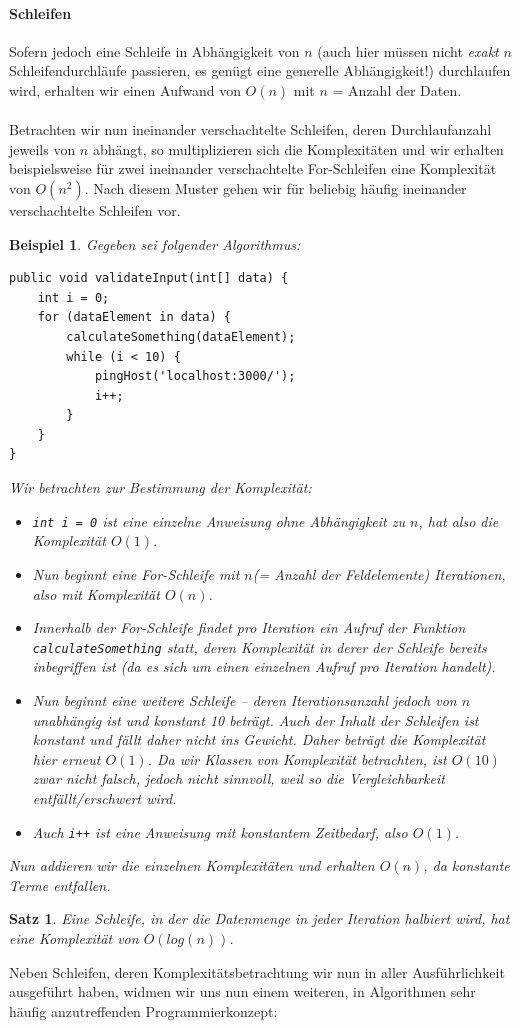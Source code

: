 \documentclass[11pt,a4paper]{scrartcl}
\newtheorem{satz}{Satz}
\newtheorem{example}{Beispiel}
\begin{document}
\paragraph{Schleifen} 
Sofern jedoch eine Schleife in Abhängigkeit von $n$ (auch hier müssen nicht \textit{exakt} $n$ Schleifendurchläufe passieren, es genügt eine generelle Abhängigkeit!) durchlaufen wird, erhalten wir einen Aufwand von $O(n)$ mit $n$ = Anzahl der Daten. \\\\
Betrachten wir nun ineinander verschachtelte Schleifen, deren Durchlaufanzahl jeweils von $n$ abhängt, so multiplizieren sich die Komplexitäten und wir erhalten beispielsweise für zwei ineinander verschachtelte For-Schleifen eine Komplexität von $O(n^2)$. Nach diesem Muster gehen wir für beliebig häufig ineinander verschachtelte Schleifen vor.
\begin{example}
Gegeben sei folgender Algorithmus:
\begin{lstlisting}
public void validateInput(int[] data) {
	int i = 0;
	for (dataElement in data) {
		calculateSomething(dataElement);
		while (i < 10) {
			pingHost('localhost:3000/');
			i++;		
		}
	}
}
\end{lstlisting}
Wir betrachten zur Bestimmung der Komplexität:
\begin{itemize}
\item \texttt{int i = 0} ist eine einzelne Anweisung ohne Abhängigkeit zu $n$, hat also die Komplexität $O(1)$.
\item Nun beginnt eine For-Schleife mit $n$(= Anzahl der Feldelemente) Iterationen, also mit Komplexität $O(n)$.
\item Innerhalb der For-Schleife findet pro Iteration ein Aufruf der Funktion \texttt{calculateSomething} statt, deren Komplexität in derer der Schleife bereits inbegriffen ist (da es sich um einen einzelnen Aufruf pro Iteration handelt).
\item Nun beginnt eine weitere Schleife -- deren Iterationsanzahl jedoch von $n$ unabhängig ist und konstant 10 beträgt. Auch der Inhalt der Schleifen ist konstant und fällt daher nicht ins Gewicht. Daher beträgt die Komplexität hier erneut $O(1)$. Da wir Klassen von Komplexität betrachten, ist $O(10)$ zwar nicht falsch, jedoch nicht sinnvoll, weil so die Vergleichbarkeit entfällt/erschwert wird.
\item Auch \texttt{i++} ist eine Anweisung mit konstantem Zeitbedarf, also $O(1)$.
\end{itemize}
Nun addieren wir die einzelnen Komplexitäten und erhalten $O(n)$, da konstante Terme entfallen.
\end{example}
\begin{satz}
Eine Schleife, in der die Datenmenge in jeder Iteration halbiert wird, hat eine Komplexität von $O(log(n))$.
\end{satz}
Neben Schleifen, deren Komplexitätsbetrachtung wir nun in aller Ausführlichkeit ausgeführt haben, widmen wir uns nun einem weiteren, in Algorithmen sehr häufig anzutreffenden Programmierkonzept:
\end{document}
